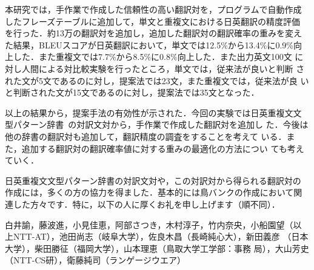\documentclass[japanese]{jnlp_1.4}
\begin{document}
本研究では，手作業で作成した信頼性の高い翻訳対を，プログラムで自動作成
したフレーズテーブルに追加して，単文と重複文における日英翻訳の精度評価
を行った．約13万の翻訳対を追加し，追加した翻訳対の翻訳確率の重みを変え
た結果，BLEUスコアが日英翻訳において，単文では12.5\%から13.4\%に0.9\%向
上した．また重複文では7.7\%から8.5\%に0.8\%向上した．また出力英文100文
に対し人間による対比較実験を行ったところ，単文では，従来法が良いと判断
された文が5文であるのに対し，提案法では23文，また重複文では，従来法が良
いと判断された文が15文であるのに対し，提案法では35文となった．

以上の結果から，提案手法の有効性が示された．今回の実験では日英重複文文
型パターン辞書~\cite{tori}の対訳文対から，手作業で作成した翻訳対を追加し
た．今後は他の辞書の翻訳対も追加して，翻訳精度の調査をすることを考えて
いる．また，追加する翻訳対の翻訳確率値に対する重みの最適化の方法につい
ても考えていく．

\acknowledgment

日英重複文文型パターン辞書の対訳文対や，この対訳対から得られる翻訳対の
作成には，多くの方の協力を得ました．基本的には鳥バンクの作成において関
連した方々です．特に，以下の人に厚くお礼を申し上げます（順不同）．

白井諭，藤波進，小見佳恵，阿部さつき，木村淳子，竹内奈央，小船園望（以
  上NTT-AT），池田尚志（岐阜大学），佐良木昌（長崎純心大），新田義彦
（日本大学），柴田勝征（福岡大学），山本理恵（鳥取大学工学部：事務
  局），大山芳史（NTT-CS研），衛藤純司（ランゲージウエア）
\end{document}
